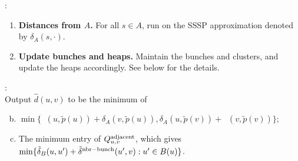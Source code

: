 \documentclass[11pt]{article}
\theoremstyle{definition}
\theoremstyle{remark}
\DeclareMathOperator{\dLNbunch}{\delta_{\tilde{B}}}
\begin{document}
\begin{titlepage}
\noindent{}:
\begin{enumerate}[(1)]
     \item \textbf{Distances from $A$.} For all $s\in A$, run  on the SSSP approximation denoted by $\delta_A(s,\cdot)$. %
    \item \textbf{Update bunches and heaps.} Maintain the bunches and clusters, and update the heaps accordingly. See below for the details.  \label{step:update3}
\end{enumerate}

 \noindent{}:\\
    Output $\hat d(u, v)$ to be the minimum of 
    \begin{enumerate}[(a)]\setcounter{enumi}{1}
         \item $\min\{ \dLNbunch(u,\tilde p(u))+\delta_A(v,\tilde p(u)),\delta_A(u,\tilde p(v))+\dLNbunch(v,\tilde p(v))\}$;\label{step:pivot}
        \item The minimum entry of $Q^{\rm{adjacent}}_{u,v}$, which gives $\min\{\tilde \delta_B(u,u')+\tilde \delta^{\rm{nbr-bunch}}(u',v): u'\in B(u)%
        \}$. \label{step:nbr_light1}
    \end{enumerate}
    




\end{titlepage}
\end{document}

